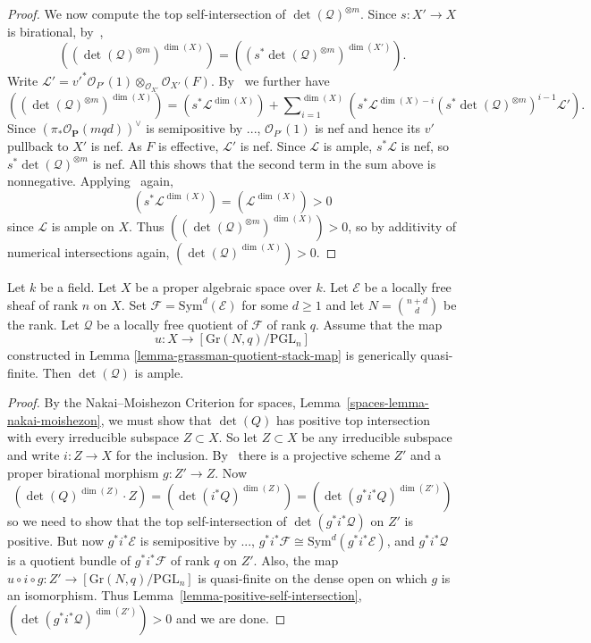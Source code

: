 \begin{proof}
We now compute the top self-intersection of $\det(\mathcal{Q})^{\otimes m}$.
Since $s : X' \to X$ is birational, by~,
$$
  ((\det(\mathcal{Q})^{\otimes m})^{\dim(X)})
    = ((s^*\det(\mathcal{Q})^{\otimes m})^{\dim(X')}).
$$
Write
$\mathcal{L}'
  = v'^*\mathcal{O}_{P'}(1) \otimes_{\mathcal{O}_{X'}} \mathcal{O}_{X'}(F)$.
By~ we further have
$$
  ((\det(\mathcal{Q})^{\otimes m})^{\dim(X)})
    = (s^*\mathcal{L}^{\dim(X)})
      + \sum\nolimits_{i = 1}^{\dim(X)}
          (s^*\mathcal{L}^{\dim(X) - i} (s^*\det(\mathcal{Q})^{\otimes m})^{i - 1} \mathcal{L}').
$$
Since $(\pi_*\mathcal{O}_{\mathbf{P}}(mqd))^\vee$ is semipositive by
...,
$\mathcal{O}_{P'}(1)$ is nef and hence its $v'$ pullback to $X'$ is nef.
As $F$ is effective, $\mathcal{L}'$ is nef.
Since $\mathcal{L}$ is ample, $s^*\mathcal{L}$ is nef, so
$s^*\det(\mathcal{Q})^{\otimes m}$ is nef.
All this shows that the second term in the sum above is nonnegative.
Applying~ again,
$$
  (s^*\mathcal{L}^{\dim(X)}) = (\mathcal{L}^{\dim(X)}) > 0
$$
since $\mathcal{L}$ is ample on $X$.
Thus $((\det(\mathcal{Q})^{\otimes m})^{\dim(X)}) > 0$, so by additivity of
numerical intersections again, $(\det(\mathcal{Q})^{\dim(X)}) > 0$.
\end{proof}

\begin{lemma}
Let $k$ be a field.
Let $X$ be a proper algebraic space over $k$.
Let $\mathcal{E}$ be a locally free sheaf of rank $n$ on $X$.
Set $\mathcal{F} = \mathrm{Sym}^d(\mathcal{E})$ for some $d \geq 1$ and
let $N = \binom{n + d}{d}$ be the rank.
Let $\mathcal{Q}$ be a locally free quotient of $\mathcal{F}$ of rank $q$.
Assume that the map
$$
u : X \to [\mathrm{Gr}(N,q)/\mathrm{PGL}_n]
$$
constructed in Lemma \ref{lemma-grassman-quotient-stack-map}
is generically quasi-finite.
Then $\det(\mathcal{Q})$ is ample.
\end{lemma}

\begin{proof}
By the Nakai--Moishezon Criterion for spaces,
Lemma~\ref{spaces-lemma-nakai-moishezon},
we must show that $\det(Q)$ has positive top intersection with every
irreducible subspace $Z \subset X$.
So let $Z \subset X$ be any irreducible subspace and write $i : Z \to X$ for
the inclusion.
By~ there is a projective scheme $Z'$ and a proper birational
morphism $g : Z' \to Z$.
Now
$$
  (\det(Q)^{\dim(Z)} \cdot Z)
    = (\det(i^*Q)^{\dim(Z)})
    = (\det(g^*i^*Q)^{\dim(Z')})
$$
so we need to show that the top self-intersection of $\det(g^*i^*\mathcal{Q})$
on $Z'$ is positive.
But now $g^*i^*\mathcal{E}$ is semipositive by ...,
$g^*i^*\mathcal{F} \cong \mathrm{Sym}^d(g^*i^*\mathcal{E})$,
and $g^*i^*\mathcal{Q}$ is a quotient bundle of $g^*i^*\mathcal{F}$ of rank $q$
on $Z'$.
Also, the map $u \circ i \circ g : Z' \to [\mathrm{Gr}(N,q)/\mathrm{PGL}_n]$
is quasi-finite on the dense open on which $g$ is an isomorphism.
Thus Lemma~\ref{lemma-positive-self-intersection},
$(\det(g^*i^*\mathcal{Q})^{\dim(Z')}) > 0$ and we are done.
\end{proof}


